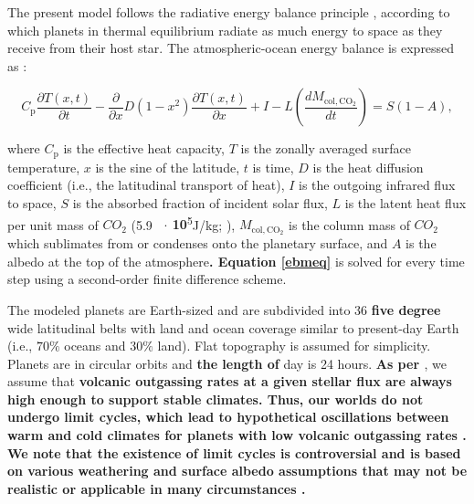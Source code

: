 \documentclass[fleqn,usenatbib]{mnras}
\providecommand{\DIFadd}[1]{{\bf #1}} %
\providecommand{\DIFdel}[1]{} %
\providecommand{\DIFaddbegin}{} %
\providecommand{\DIFaddend}{} %
\providecommand{\DIFdelbegin}{} %
\providecommand{\DIFdelend}{} %
\newcommand{\DIFscaledelfig}{0.5}
\newlength{\DIFdelgraphicswidth} %
\newlength{\DIFdelgraphicsheight} %
\newcommand{\DIFaddincludegraphics}[2][]{{\color{blue}\fbox{\DIFOincludegraphics[#1]{#2}}}} %
\newcommand{\DIFdelincludegraphics}[2][]{%
\sbox{\DIFdelgraphicsbox}{\DIFOincludegraphics[#1]{#2}}%
\settoboxwidth{\DIFdelgraphicswidth}{\DIFdelgraphicsbox} %
\settoboxtotalheight{\DIFdelgraphicsheight}{\DIFdelgraphicsbox} %
\scalebox{\DIFscaledelfig}{%
\parbox[b]{\DIFdelgraphicswidth}{\usebox{\DIFdelgraphicsbox}\\[-\baselineskip] \rule{\DIFdelgraphicswidth}{0em}}\llap{\resizebox{\DIFdelgraphicswidth}{\DIFdelgraphicsheight}{%
\setlength{\unitlength}{\DIFdelgraphicswidth}%
\begin{picture}(1,1)%
\thicklines\linethickness{2pt} %
{\color[rgb]{1,0,0}\put(0,0){\framebox(1,1){}}}%
{\color[rgb]{1,0,0}\put(0,0){\line( 1,1){1}}}%
{\color[rgb]{1,0,0}\put(0,1){\line(1,-1){1}}}%
\end{picture}%
}\hspace*{3pt}}} %
} %
\DeclareRobustCommand{\DIFaddbegin}{\DIFOaddbegin \let\includegraphics\DIFaddincludegraphics} %
\DeclareRobustCommand{\DIFaddend}{\DIFOaddend \let\includegraphics\DIFOincludegraphics} %
\DeclareRobustCommand{\DIFdelbegin}{\DIFOdelbegin \let\includegraphics\DIFdelincludegraphics} %
\DeclareRobustCommand{\DIFdelend}{\DIFOaddend \let\includegraphics\DIFOincludegraphics} %
\begin{document}
The present model follows the radiative energy balance principle \citep[e.g.,][]{Williams1997}, according to which planets in thermal equilibrium radiate as much energy to space as they receive from their host star. The atmospheric-ocean energy balance is expressed as \DIFdelbegin \DIFdel{\citep[e.g.,][]{james1982,Williams1997}}\DIFdelend \DIFaddbegin \DIFadd{\citep[e.g.,][]{james1982,Williams1997,batalha2016}}\DIFaddend : 

\begin{equation}
\label{ebmeq}
    C_{\mathrm{p}} \frac{\partial T(x, t)}{\partial t}-\frac{\partial}{\partial x} D\left(1-x^{2}\right) \frac{\partial T(x, t)}{\partial x}+I-L\left (\frac{dM_{\mathrm{col,CO_{\mathrm{2}}}}}{dt}\right )=S(1-A),
\end{equation}{}

where $C_{\mathrm{p}}$ is the effective heat capacity, $T$ is the zonally averaged surface temperature, $x$ is the sine of the latitude, $t$ is time, $D$ is the heat diffusion coefficient (i.e., the latitudinal transport of heat), $I$ is the outgoing infrared flux to space, $S$ is the absorbed fraction of incident solar flux, $L$ is the latent heat flux per unit mass of $CO_{\mathrm{2}}$ (5.9 \DIFdelbegin \DIFdel{x10}\DIFdelend \DIFaddbegin \DIFadd{\ $\cdot$ 10}\DIFaddend \textsuperscript{5}J/kg; \citet{forget1998}), $M_{\mathrm{col,CO_{\mathrm{2}}}}$ is the column mass of $CO_{\mathrm{2}}$ which sublimates from or condenses onto the planetary surface, and $A$ is the albedo at the top of the atmosphere\DIFdelbegin \DIFdel{over a given time step. This equation }\DIFdelend \DIFaddbegin \DIFadd{. Equation \ref{ebmeq} }\DIFaddend is solved for every time step using a second-order finite difference scheme.

The modeled planets are Earth-sized and are subdivided into 36 \DIFdelbegin \DIFdel{$5^{\circ}$ }\DIFdelend \DIFaddbegin \DIFadd{five degree }\DIFaddend wide latitudinal belts with land and ocean coverage similar to present-day Earth (i.e., $70 \%$ oceans and $30 \%$ land). Flat topography is assumed for simplicity. Planets are in circular orbits and \DIFdelbegin \DIFdel{a }\DIFdelend \DIFaddbegin \DIFadd{the length of }\DIFaddend day is 24 hours. \DIFdelbegin \DIFdel{For the calculations}\DIFdelend \DIFaddbegin \DIFadd{As per \citet{Turbet2017}}\DIFaddend , we assume that \DIFaddbegin \DIFadd{volcanic outgassing rates at a given stellar flux are always high enough to support stable climates. Thus, our worlds do not undergo limit cycles, which lead to hypothetical oscillations between warm and cold climates for planets with low volcanic outgassing rates \citep{haqq2016limit,paradise2017,kadoya_outer_2019}. We note that the existence of limit cycles is controversial and is based on various weathering and surface albedo assumptions that may not be realistic or applicable in many circumstances \citep{ramirez2017mars,graham-a}.
}
\end{document}

